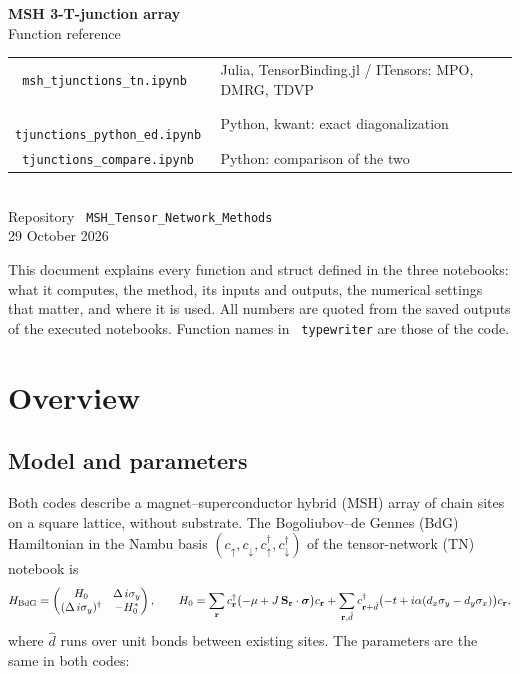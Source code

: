 \documentclass[11pt]{article}
\renewcommand{\code}[1]{\texttt{\hyphenchar\font=-1 #1}}
\begin{document}
\begin{center}
{\LARGE\bfseries MSH 3-T-junction array}\\[0.5em]
{\Large Function reference}\\[1.2em]
\begin{tabular}{ll}
\code{msh\_tjunctions\_tn.ipynb} & Julia, TensorBinding.jl / ITensors: MPO, DMRG, TDVP\\
\code{tjunctions\_python\_ed.ipynb} & Python, kwant: exact diagonalization\\
\code{tjunctions\_compare.ipynb} & Python: comparison of the two\\
\end{tabular}\\[1.2em]
Repository \code{MSH\_Tensor\_Network\_Methods}\\[0.3em]
29 October 2026
\end{center}

\vspace{1em}
\noindent This document explains every function and struct defined in the three notebooks: what it computes, the method,
its inputs and outputs, the numerical settings that matter, and where it is used. All numbers are quoted from the saved
outputs of the executed notebooks. Function names in \code{typewriter} are those of the code.

\tableofcontents
\clearpage

\section{Overview}

\subsection{Model and parameters}

Both codes describe a magnet--superconductor hybrid (MSH) array of chain sites on a square lattice, without substrate. The
Bogoliubov--de Gennes (BdG) Hamiltonian in the Nambu basis $(c_\uparrow, c_\downarrow, c^\dagger_\uparrow, c^\dagger_\downarrow)$ of the
tensor-network (TN) notebook is
\[
H_{\rm BdG} = \begin{pmatrix} H_0 & \Delta\, i\sigma_y \\ (\Delta\, i\sigma_y)^\dagger & -H_0^* \end{pmatrix},
\qquad
H_0 = \sum_{\mathbf r} c^\dagger_{\mathbf r}\bigl(-\mu + J\,\mathbf S_{\mathbf r}\cdot\boldsymbol\sigma\bigr)c_{\mathbf r}
 + \sum_{\mathbf r,\hat d} c^\dagger_{\mathbf r+\hat d}\bigl(-t + i\alpha(d_x\sigma_y - d_y\sigma_x)\bigr)c_{\mathbf r},
\]
where $\hat d$ runs over unit bonds between existing sites. The parameters are the same in both codes:
\end{document}
